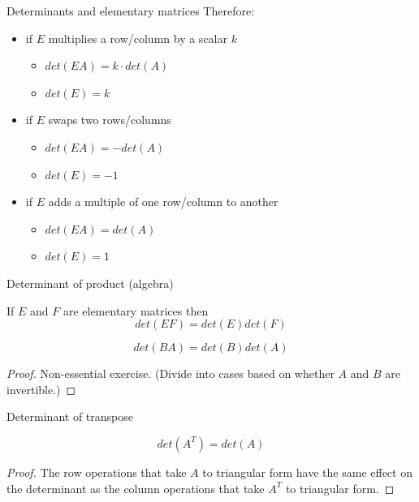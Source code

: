 \documentclass{beamer}
\begin{document}
\begin{frame}{Determinants and elementary matrices}
  Therefore:\vfill
  \begin{itemize}
  \item if $E$ multiplies a row/column by a scalar $k$
    \begin{itemize}
    \item $det(EA)=k\cdot det(A)$
    \item $det(E)=k$
    \end{itemize}\vfill
  \item if $E$ swaps two rows/columns
    \begin{itemize}
    \item $det(EA) = -det(A)$
    \item $det(E) = -1$
    \end{itemize}\vfill
  \item if $E$ adds a multiple of one row/column to another
    \begin{itemize}
    \item $det(EA) = det(A)$
    \item $det(E) = 1$
    \end{itemize}
  \end{itemize}
\end{frame}

\begin{frame}{Determinant of product (algebra)}
  \begin{lemma}
    If $E$ and $F$ are elementary matrices then
    \begin{equation*}
      det(EF) = det(E)det(F)
    \end{equation*}
  \end{lemma}\vfill
  \begin{theorem}
    \begin{equation*}
      det(BA) = det(B)det(A)
    \end{equation*}
    \begin{proof}
      Non-essential exercise. (Divide into cases based on whether $A$ and $B$ are invertible.)
    \end{proof}
  \end{theorem}
\end{frame}

\begin{frame}{Determinant of transpose}
  \begin{theorem}
    \begin{equation*}
      det(A^T) = det(A)
    \end{equation*}
    \begin{proof}
      The row operations that take $A$ to triangular form have the same effect on the determinant as the column operations that take $A^T$ to triangular form.
    \end{proof}
  \end{theorem}
\end{frame}
\end{document}
